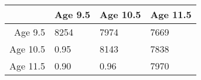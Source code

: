 \begin{table}[ht]
\centering
\begin{tabular}{rlll}
  \hline
 & Age 9.5 & Age 10.5 & Age 11.5 \\ 
  \hline
Age 9.5 & 8254 & 7974 & 7669 \\ 
  Age 10.5 &  0.95 & 8143 & 7838 \\ 
  Age 11.5 &  0.90 &  0.96 & 7970 \\ 
   \hline
\end{tabular}
\end{table}
